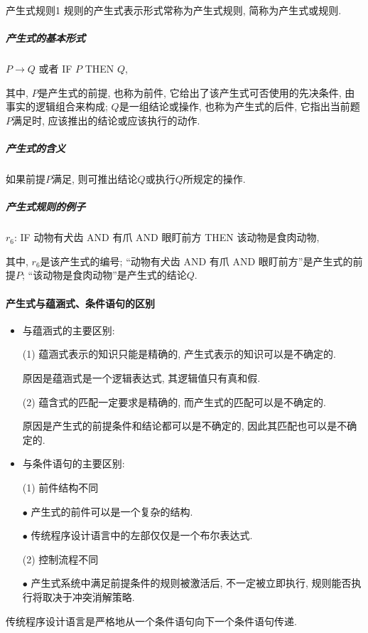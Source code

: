 \begin{mydef}{产生式规则}{1}
    规则的产生式表示形式常称为产生式规则, 简称为产生式或规则.
\end{mydef}
\subparagraph{产生式的基本形式}
\begin{center}
  $P\rightarrow Q$  或者     IF  $P$  THEN $Q$,
\end{center}
其中, $P$是产生式的前提, 也称为前件, 它给出了该产生式可否使用的先决条件, 由事实的逻辑组合来构成;
$Q$是一组结论或操作, 也称为产生式的后件, 它指出当前题$P$满足时, 应该推出的结论或应该执行的动作.
\subparagraph{产生式的含义}
\begin{center}
    如果前提$P$满足, 则可推出结论$Q$或执行$Q$所规定的操作.
\end{center}
\subparagraph{产生式规则的例子}
\begin{center}
    $r_6$:  IF 动物有犬齿 AND 有爪 AND 眼盯前方   THEN 该动物是食肉动物,
\end{center}
其中, $r_6$是该产生式的编号; “动物有犬齿 AND 有爪 AND 眼盯前方”是产生式的前提$P$; “该动物是食肉动物”是产生式的结论$Q$.
\paragraph{产生式与蕴涵式、条件语句的区别}
\begin{itemize}
\item 与蕴涵式的主要区别:

     (1) 蕴涵式表示的知识只能是精确的, 产生式表示的知识可以是不确定的.

    \quad 原因是蕴涵式是一个逻辑表达式, 其逻辑值只有真和假.

     (2) 蕴含式的匹配一定要求是精确的, 而产生式的匹配可以是不确定的.

    \quad 原因是产生式的前提条件和结论都可以是不确定的, 因此其匹配也可以是不确定的.

\item 与条件语句的主要区别:

    (1) 前件结构不同

    \quad $\bullet$ 产生式的前件可以是一个复杂的结构.

    \quad $\bullet$ 传统程序设计语言中的左部仅仅是一个布尔表达式.

    (2) 控制流程不同

    \quad $\bullet$ 产生式系统中满足前提条件的规则被激活后, 不一定被立即执行, 规则能否执行将取决于冲突消解策略.
\end{itemize}
\begin{remark}
    传统程序设计语言是严格地从一个条件语句向下一个条件语句传递.
\end{remark}
